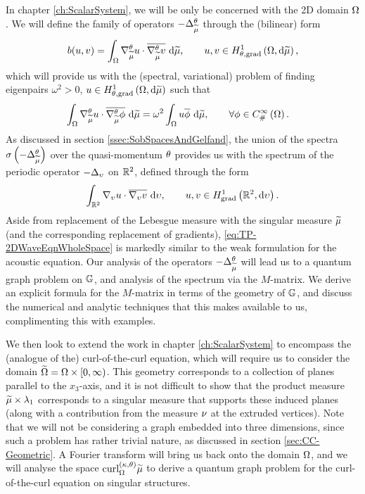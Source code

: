 In chapter \ref{ch:ScalarSystem}, we will be only be concerned with the 2D domain $\Omega$.
We will define the family of operators $-\Delta_{\widetilde{\mu}}^{\theta}$ through the (bilinear) form 
\begin{align*}
	b(u,v) = \int_{\Omega} \nabla^{\theta}_{\widetilde{\mu}} u\cdot\overline{\nabla^{\theta}_{\widetilde{\mu}} v}  \ \mathrm{d}\widetilde{\mu},
	\qquad u,v\in H^1_{\theta, \mathrm{grad}}\left( \Omega, \mathrm{d}\widetilde{\mu} \right),
\end{align*}
which will provide us with the (spectral, variational) problem of finding eigenpairs $\omega^2>0$, $u\in H^1_{\theta, \mathrm{grad}}\left( \Omega, \mathrm{d}\widetilde{\mu} \right)$ such that
\begin{align*}
	\int_{\Omega} \nabla^{\theta}_{\widetilde{\mu}} u\cdot\overline{\nabla^{\theta}_{\widetilde{\mu}}\phi}  \ \mathrm{d}\widetilde{\mu}
	&= \omega^2\int_{\Omega} u\overline{\phi}  \ \mathrm{d}\widetilde{\mu},
	\qquad\forall\phi\in C^{\infty}_{\#}\left( \Omega \right).
\end{align*}
As discussed in section \ref{ssec:SobSpacesAndGelfand}, the union of the spectra $\sigma\left( -\Delta_{\widetilde{\mu}}^{\theta} \right)$ over the quasi-momentum $\theta$ provides us with the spectrum of the periodic operator $-\Delta_{\upsilon}$ on $\mathbb{R}^2$, defined through the form
\begin{align} \label{eq:TP-2DWaveEqnWholeSpace}
	\int_{\mathbb{R}^2} \nabla_{\upsilon} u\cdot\overline{\nabla_{\upsilon} v}  \ \mathrm{d}\upsilon,
	\qquad u,v\in H^1_\mathrm{grad}\left( \mathbb{R}^2, \mathrm{d}\upsilon \right).
\end{align}
Aside from replacement of the Lebesgue measure with the singular measure $\widetilde{\mu}$ (and the corresponding replacement of gradients), \eqref{eq:TP-2DWaveEqnWholeSpace} is markedly similar to the weak formulation for the acoustic equation.
Our analysis of the operators $-\Delta_{\widetilde{\mu}}^{\theta}$ will lead us to a quantum graph problem on $\mathbb{G}$, and analysis of the spectrum via the $M$-matrix.
We derive an explicit formula for the $M$-matrix in terms of the geometry of $\mathbb{G}$, and discuss the numerical and analytic techniques that this makes available to us, complimenting this with examples.

We then look to extend the work in chapter \ref{ch:ScalarSystem} to encompass the (analogue of the) curl-of-the-curl equation, which will require us to consider the domain $\widetilde{\Omega} = \Omega\times[0,\infty)$.
This geometry corresponds to a collection of planes parallel to the $x_3$-axis, and it is not difficult to show that the product measure $\widetilde{\mu}\times\lambda_1$ corresponds to a singular measure that supports these induced planes (along with a contribution from the measure $\nu$ at the extruded vertices).
Note that we will not be considering a graph embedded into three dimensions, since such a problem has rather trivial nature, as discussed in section \ref{sec:CC-Geometric}.
A Fourier transform will bring us back onto the domain $\Omega$, and we will analyse the space $\mathrm{curl}_{\Omega}^{\left( \kappa, \theta \right)}{\widetilde{\mu}}$ to derive a quantum graph problem for the curl-of-the-curl equation on singular structures.

